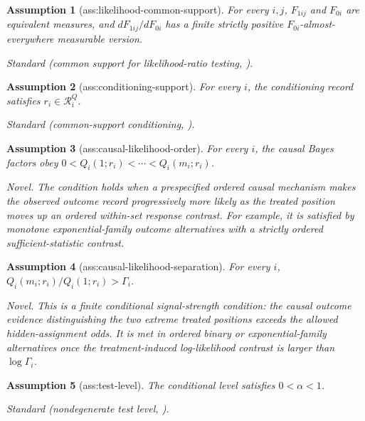 \documentclass{article}
\newtheorem{assumption}{Assumption}
\begin{document}
\begin{assumption}[ass:likelihood-common-support]\label{ass:likelihood-common-support}
For every \(i,j\), \(F_{1ij}\) and \(F_{0i}\) are equivalent measures, and \(dF_{1ij}/dF_{0i}\) has a finite strictly positive \(F_{0i}\)-almost-everywhere measurable version.
\par\smallskip\noindent\emph{Standard} (common support for likelihood-ratio testing, \cite{HuberStrassen1973Minimax}).
\end{assumption}

\begin{assumption}[ass:conditioning-support]\label{ass:conditioning-support}
For every \(i\), the conditioning record satisfies \(r_i\in\mathcal R_i^Q\).
\par\smallskip\noindent\emph{Standard} (common-support conditioning, \cite{HuberStrassen1973Minimax}).
\end{assumption}

\begin{assumption}[ass:causal-likelihood-order]\label{ass:causal-likelihood-order}
For every \(i\), the causal Bayes factors obey \(0<Q_i(1;r_i)<\cdots<Q_i(m_i;r_i)\).
\par\smallskip\noindent\emph{Novel.} The condition holds when a prespecified ordered causal mechanism makes the observed outcome record progressively more likely as the treated position moves up an ordered within-set response contrast. For example, it is satisfied by monotone exponential-family outcome alternatives with a strictly ordered sufficient-statistic contrast.
\end{assumption}

\begin{assumption}[ass:causal-likelihood-separation]\label{ass:causal-likelihood-separation}
For every \(i\), \(Q_i(m_i;r_i)/Q_i(1;r_i)>\Gamma_i\).
\par\smallskip\noindent\emph{Novel.} This is a finite conditional signal-strength condition: the causal outcome evidence distinguishing the two extreme treated positions exceeds the allowed hidden-assignment odds. It is met in ordered binary or exponential-family alternatives once the treatment-induced log-likelihood contrast is larger than \(\log\Gamma_i\).
\end{assumption}

\begin{assumption}[ass:test-level]\label{ass:test-level}
The conditional level satisfies \(0<\alpha<1\).
\par\smallskip\noindent\emph{Standard} (nondegenerate test level, \cite{HuberStrassen1973Minimax}).
\end{assumption}
\end{document}
